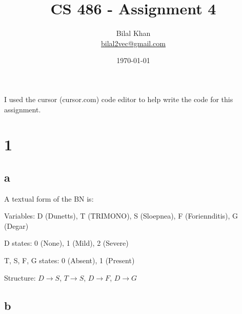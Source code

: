 \documentclass[11pt]{article}
\title{CS 486 - Assignment 4}
\author{Bilal Khan\\
\href{mailto:bilal2vec@gmail.com}{bilal2vec@gmail.com}}
\date{\today}
\begin{document}
\maketitle
\tableofcontents

I used the cursor (cursor.com) code editor to help write the code for this assignment.

\section{1}

\subsection{a}

A textual form of the BN is:

Variables: D (Dunetts), T (TRIMONO), S (Sloepnea), F (Foriennditis), G (Degar)

D states: 0 (None), 1 (Mild), 2 (Severe)

T, S, F, G states: 0 (Absent), 1 (Present)

Structure: $D \rightarrow S$, $T \rightarrow S$, $D \rightarrow F$, $D \rightarrow G$

\subsection{b}
\end{document}
